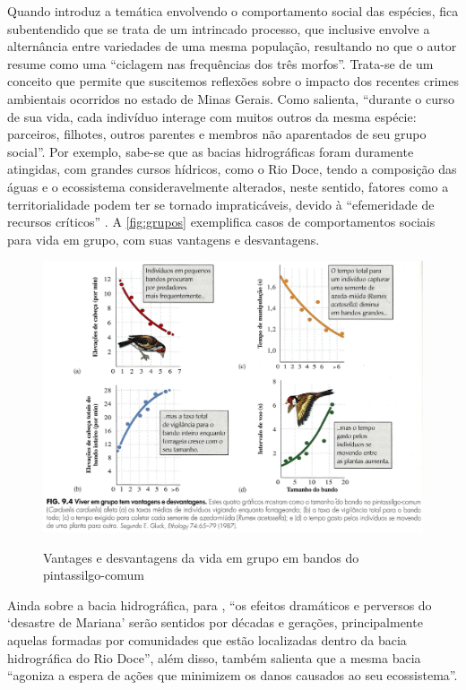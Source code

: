 \documentclass[
article,			%
11pt,				%
oneside,			%
a4paper,			%
english,			%
brazil,				%
sumario=tradicional
]{abntex2}
\begin{document}
	Quando  introduz a temática envolvendo o comportamento social das espécies, fica subentendido que se trata de um intrincado processo, que inclusive envolve a alternância entre variedades de uma mesma população, resultando no que o autor resume como uma ``ciclagem nas frequências dos três morfos''. Trata-se de um conceito que permite que suscitemos reflexões sobre o impacto dos recentes crimes ambientais ocorridos no estado de Minas Gerais. Como  salienta, ``durante o curso de sua vida, cada indivíduo interage com muitos outros da mesma espécie: parceiros, filhotes, outros parentes e membros não aparentados de seu grupo social''. Por exemplo, sabe-se que as bacias hidrográficas foram duramente atingidas, com grandes cursos hídricos, como o Rio Doce, tendo a composição das águas e o ecossistema consideravelmente alterados, neste sentido, fatores como a territorialidade podem ter se tornado impraticáveis, devido à ``efemeridade de recursos críticos'' \cite[p.162]{ricklefs2003a}. A \autoref{fig:grupos} exemplifica casos de comportamentos sociais para vida em grupo, com suas vantagens e desvantagens.
	
	\begin{figure}[htb]
		\centering
		\caption{Vantages e desvantagens da vida em grupo em bandos do pintassilgo-comum}
		\includegraphics[width=1.0\linewidth]{img/rick_180_01.png}
		\label{fig:grupos}
	\end{figure}
	
	Ainda sobre a bacia hidrográfica, para , ``os efeitos dramáticos e perversos do `desastre de Mariana' serão sentidos por décadas e gerações, principalmente aquelas formadas por comunidades que estão localizadas dentro da bacia hidrográfica do Rio Doce'', além disso,  também salienta que a mesma bacia ``agoniza a espera de ações que minimizem os danos causados ao seu ecossistema''.
	
\end{document}

